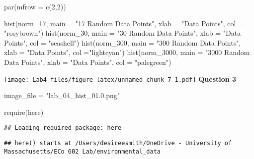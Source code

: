 \documentclass[
]{article}
\newenvironment{Shaded}{\begin{snugshade}}{\end{snugshade}}
\newcommand{\AttributeTok}[1]{\textcolor[rgb]{0.77,0.63,0.00}{#1}}
\newcommand{\DecValTok}[1]{\textcolor[rgb]{0.00,0.00,0.81}{#1}}
\newcommand{\FunctionTok}[1]{\textcolor[rgb]{0.00,0.00,0.00}{#1}}
\newcommand{\NormalTok}[1]{#1}
\newcommand{\OtherTok}[1]{\textcolor[rgb]{0.56,0.35,0.01}{#1}}
\newcommand{\StringTok}[1]{\textcolor[rgb]{0.31,0.60,0.02}{#1}}
\begin{document}
\begin{Shaded}
\begin{Highlighting}[]
\FunctionTok{par}\NormalTok{(}\AttributeTok{mfrow =} \FunctionTok{c}\NormalTok{(}\DecValTok{2}\NormalTok{,}\DecValTok{2}\NormalTok{))}

\FunctionTok{hist}\NormalTok{(norm\_17, }\AttributeTok{main =} \StringTok{"17 Random Data Points"}\NormalTok{, }\AttributeTok{xlab =} \StringTok{"Data Points"}\NormalTok{, }\AttributeTok{col =} \StringTok{"rosybrown"}\NormalTok{)}
\FunctionTok{hist}\NormalTok{(norm\_30,  }\AttributeTok{main =} \StringTok{"30 Random Data Points"}\NormalTok{, }\AttributeTok{xlab =} \StringTok{"Data Points"}\NormalTok{, }\AttributeTok{col =} \StringTok{"seashell"}\NormalTok{)}
\FunctionTok{hist}\NormalTok{(norm\_300,  }\AttributeTok{main =} \StringTok{"300 Random Data Points"}\NormalTok{, }\AttributeTok{xlab =} \StringTok{"Data Points"}\NormalTok{, }\AttributeTok{col =}\StringTok{"lightcyan"}\NormalTok{)}
\FunctionTok{hist}\NormalTok{(norm\_3000,  }\AttributeTok{main =} \StringTok{"3000 Random Data Points"}\NormalTok{, }\AttributeTok{xlab =} \StringTok{"Data Points"}\NormalTok{, }\AttributeTok{col =} \StringTok{"palegreen"}\NormalTok{)}
\end{Highlighting}
\end{Shaded}

\texttt{[image: Lab4\_files/figure-latex/unnamed-chunk-7-1.pdf]}
\textbf{Question 3}

\begin{Shaded}
\begin{Highlighting}[]
\NormalTok{image\_file }\OtherTok{=} \StringTok{"lab\_04\_hist\_01.0.png"}

\FunctionTok{require}\NormalTok{(here)}
\end{Highlighting}
\end{Shaded}

\begin{verbatim}
## Loading required package: here
\end{verbatim}

\begin{verbatim}
## here() starts at /Users/desireesmith/OneDrive - University of Massachusetts/ECo 602 Lab/environmental_data
\end{verbatim}
\end{document}
